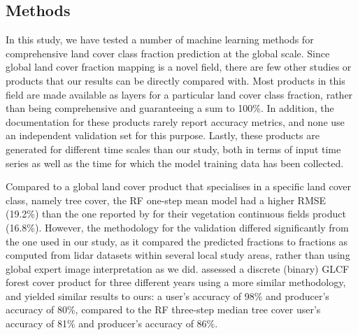 \documentclass[review,authoryear,3p]{elsarticle}
\begin{document}
\subsection{Methods}

In this study, we have tested a number of machine learning methods for comprehensive land cover class fraction prediction at the global scale.
Since global land cover fraction mapping is a novel field, there are few other studies or products that our results can be directly compared with.
Most products in this field are made available as layers for a particular land cover class fraction, rather than being comprehensive and guaranteeing a sum to 100\%.
In addition, the documentation for these products rarely report accuracy metrics, and none use an independent validation set for this purpose.
Lastly, these products are generated for different time scales than our study, both in terms of input time series as well as the time for which the model training data has been collected.


Compared to a global land cover product that specialises in a specific land cover class, namely tree cover, the \gls{RF} one-step mean model had a higher RMSE (19.2\%) than the one reported by \citet{sexton_global_2013} for their vegetation continuous fields product (16.8\%).
However, the methodology for the validation differed significantly from the one used in our study, as it compared the predicted fractions to fractions as computed from lidar datasets within several local study areas, rather than using global expert image interpretation as we did.
\citet{feng_earth_2016} assessed a discrete (binary) GLCF forest cover product for three different years using a more similar methodology, and yielded similar results to ours: a user's accuracy of 98\% and producer's accuracy of 80\%, compared to the \gls{RF} three-step median tree cover user's accuracy of 81\% and producer's accuracy of 86\%.
\end{document}
